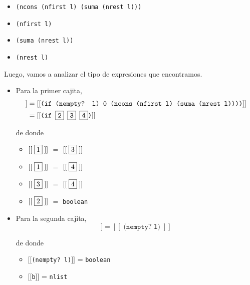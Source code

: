\documentclass[letterpaper,11pt]{article}
\begin{document}
\begin{enumerate}
\begin{enumerate}
\begin{itemize}
            \item {} \texttt{(ncons (nfirst l) (suma (nrest l)))}

            \item {} \texttt{(nfirst l)}

            \item {} \texttt{(suma (nrest l))}

            \item {} \texttt{(nrest l)}
        \end{itemize}

        Luego, vamos a analizar el tipo de expresiones que encontramos.
        \begin{itemize}
            \item Para la primer cajita, 
            \begin{align*}
                [[\; \fbox{1} \;]] 
                &= [[ \texttt{(if (nempty? l) 0 
                (ncons (nfirst l) (suma (nrest l))))}]] \\ 
                &= [[ \texttt{(if \fbox{2} \fbox{3} \fbox{4})} ]]
            \end{align*}

            de donde 
            \begin{itemize}
                \item $[[\; \fbox{1} \; ]]$ $=$ $[[\; \fbox{3} \;]]$
                \item $[[\; \fbox{1} \; ]]$ $=$ $[[\; \fbox{4} \;]]$
                \item $[[\; \fbox{3} \; ]]$ $=$ $[[\; \fbox{4} \;]]$
                \item $[[\; \fbox{2} \; ]]$ $=$ \texttt{boolean}
            \end{itemize}

            \item Para la segunda cajita, 
            \begin{equation*}
                [[\; \fbox{2} \;]] = [[\; \texttt{(nempty? l)} \;]] 
            \end{equation*}

            de donde 
            \begin{itemize}
                \item $[[$\texttt{(nempty? l)}$]]$ = \texttt{boolean}
                \item $[[$\texttt{b}$]]$ = \texttt{nlist}
            \end{itemize}


\end{itemize}
\end{enumerate}
\end{enumerate}
\end{document}
